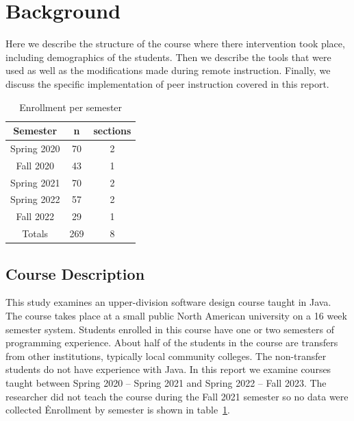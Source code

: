 \documentclass[12pt]{article}
\newcommand\classSize{269}
\begin{document}
\section{Background}

Here we describe the structure of the course where there intervention took place, including demographics of the students. Then we describe the tools that were used as well as the modifications made during remote instruction. Finally, we discuss the specific implementation of peer instruction covered in this report.

\begin{table}[ht]
\centering
\begin{tabular}{|c|c|c|}
\toprule
Semester    & n  & sections\\ \midrule
\rowcolor{LightGray}
Spring 2020 & 70 & 2 \\ \midrule
Fall 2020   & 43 & 1 \\ \midrule
\rowcolor{LightGray}
Spring 2021 & 70 & 2 \\ \midrule
Spring 2022 & 57 & 2 \\ \midrule
\rowcolor{LightGray}
Fall 2022 & 29 & 1 \\ \midrule
Totals & \classSize & 8 \\ \bottomrule
\end{tabular}
\label{table:enrollmentBySemester}
\caption{Enrollment per semester}
\end{table}

\subsection{Course Description}
This study examines an upper-division software design course taught in Java. The course takes place at a small public North American university on a 16 week semester system. Students enrolled in this course have one or two semesters of programming experience. About half of the students in the course are transfers from other institutions, typically local community colleges. The non-transfer students do not have experience with Java. 
In this report we examine courses taught between Spring 2020 – Spring 2021 and Spring 2022 – Fall 2023.  The researcher did not teach the course during the Fall 2021 semester so no data were collected \. Enrollment by semester is shown in table~\ref{table:enrollmentBySemester}.
\end{document}
